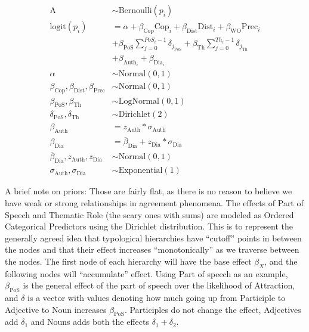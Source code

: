 \documentclass[a4paper, 12pt, article]{memoir}
\begin{document}
\begin{align*}
  \text{A}                                                     & \sim \text{Bernoulli}(p_i)                                          \\
  \text{logit}(p_i)                                            & = \alpha +
  \beta_{\text{Cop}}\text{Cop}_i +
  \beta_{\text{Dist}}\text{Dist}_i + \beta_{\text{WO}} \text{Prec}_i                                                                 \\&+
  \beta_{\text{PoS}}\sum^{PoS_{i}-1}_{j=0}{\delta_{j_{\text{PoS}}}} + \beta_{\text{Th}}\sum^{Th_{i}-1}_{j=0}{\delta_{j_{\text{Th}}}} \\&+
  \beta_{\text{Auth}_{i}} + \beta_{\text{Dia}_i}                                                                                     \\
  \alpha                                                       & \sim \text{Normal}(0, 1)                                            \\
  \beta_{\text{Cop}}, \beta_{\text{Dist}}, \beta_{\text{Prec}} & \sim \text{Normal}(0, 1)                                            \\
  \beta_{\text{PoS}}, \beta_{\text{Th}}                        & \sim \text{LogNormal}(0, 1)                                         \\
  \delta_{\text{PoS}}, \delta_{\text{Th}}                      & \sim \text{Dirichlet}(2)                                            \\
  \beta_{\text{Auth}}                                          & = z_{\text{Auth}}*\sigma_{\text{Auth}}                              \\
  \beta_{\text{Dia}}                                           & = \overline{\beta}_\text{Dia} + z_{\text{Dia}}*\sigma_{\text{Dia}}  \\
  \overline{\beta}_\text{Dia}, z_{\text{Auth}}, z_{\text{Dia}} & \sim \text{Normal}(0,1)                                             \\
  \sigma_{\text{Auth}}, \sigma_{\text{Dia}}                    & \sim \text{Exponential}(1)
\end{align*}

A brief note on priors:
Those are fairly flat, as there is no reason to believe we have weak or
strong relationships in agreement phenomena.
The effects of Part of Speech and Thematic Role (the scary ones with sums) are
modeled as Ordered Categorical Predictors using the Dirichlet distribution.
This is to represent the generally agreed idea that typological hierarchies have
``cutoff'' points in between the nodes and that their effect increases
``monotonically'' as we traverse between the nodes.
The first node of each hierarchy will have the base effect $\beta_{X}$, and the
following nodes will ``accumulate'' effect. Using Part of speech as an example,
$\beta_{\text{PoS}}$ is the general effect of the part of speech over the
likelihood of Attraction, and $\delta$ is a vector with values denoting how much
going up from Participle to Adjective to Noun increases $\beta_{\text{PoS}}$.
Participles do not change the effect, Adjectives add $\delta_1$ and Nouns adds
both the effects $\delta_1 + \delta_2$.
\end{document}
